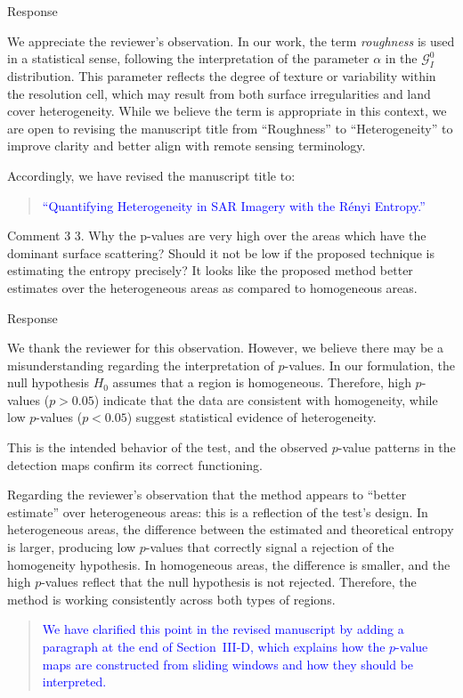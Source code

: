 \documentclass[11pt]{report}
\begin{document}
\begin{responsebox}{Response}

We appreciate the reviewer’s observation. In our work, the term \emph{roughness} is used in a statistical sense, following the interpretation of the parameter $\alpha$ in the $\mathcal{G}^0_I$ distribution. This parameter reflects the degree of texture or variability within the resolution cell, which may result from both surface irregularities and land cover heterogeneity.
 While we believe the term is appropriate in this context, we are open to revising the manuscript title from ``Roughness'' to ``Heterogeneity'' to improve clarity and better align with remote sensing terminology.

Accordingly, we have revised the manuscript title to:
\begin{quote}
	\textcolor{blue}{
	``Quantifying Heterogeneity in SAR Imagery with the Rényi Entropy.''}
\end{quote}
\end{responsebox}

\vspace{1em}
\begin{reviewbox}{Comment 3}
3. Why the p-values are very high over the areas which have the dominant surface scattering? Should it not be low if the proposed technique is estimating the entropy precisely? It looks like the proposed method better estimates over the heterogeneous areas as compared to homogeneous areas.
\end{reviewbox}

\begin{responsebox}{Response}

We thank the reviewer for this observation. However, we believe there may be a misunderstanding regarding the interpretation of $p$-values. 
In our formulation, the null hypothesis $H_0$ assumes that a region is homogeneous. Therefore, high $p$-values ($p > 0.05$) indicate that the data are consistent with homogeneity, while low $p$-values ($p < 0.05$) suggest statistical evidence of heterogeneity.


This is the intended behavior of the test, and the observed $p$-value patterns in the detection maps confirm its correct functioning.

Regarding the reviewer’s observation that the method appears to “better estimate” over heterogeneous areas: this is a reflection of the test’s design. In heterogeneous areas, the difference between the estimated and theoretical entropy is larger, producing low $p$-values that correctly signal a rejection of the homogeneity hypothesis. 
In homogeneous areas, the difference is smaller, and the high $p$-values reflect that the null hypothesis is not rejected. Therefore, the method is working consistently across both types of regions.


\begin{quote}
\textcolor{blue}{
We have clarified this point in the revised manuscript by adding a paragraph at the end of Section~III-D,  which explains how the $p$-value maps are constructed from sliding windows and how they should be interpreted.
}
\end{quote}
\end{responsebox}
\end{document}
